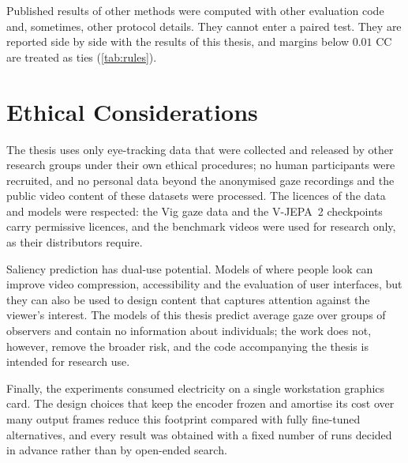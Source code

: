 Published results of other methods were computed with other evaluation code
and, sometimes, other protocol details. They cannot enter a paired test. They
are reported side by side with the results of this thesis, and margins below
$0.01$ \acrshort{CC} are treated as ties (\cref{tab:rules}).

\section{Ethical Considerations}\label{sec:ethics}

The thesis uses only eye-tracking data that were collected and released by
other research groups under their own ethical procedures; no human
participants were recruited, and no personal data beyond the anonymised gaze
recordings and the public video content of these datasets were processed. The
licences of the data and models were respected: the Vig gaze data and the
\acrshort{V-JEPA}~2 checkpoints carry permissive licences, and the benchmark videos were
used for research only, as their distributors require.

Saliency prediction has dual-use potential. Models of where people look can
improve video compression, accessibility and the evaluation of user
interfaces, but they can also be used to design content that captures
attention against the viewer's interest. The models of this thesis predict
average gaze over groups of observers and contain no information about
individuals; the work does not, however, remove the broader risk, and the
code accompanying the thesis is intended for research use.

Finally, the experiments consumed electricity on a single workstation
graphics card. The design choices that keep the encoder frozen and amortise
its cost over many output frames reduce this footprint compared with fully
fine-tuned alternatives, and every result was obtained with a fixed number of
runs decided in advance rather than by open-ended search.
